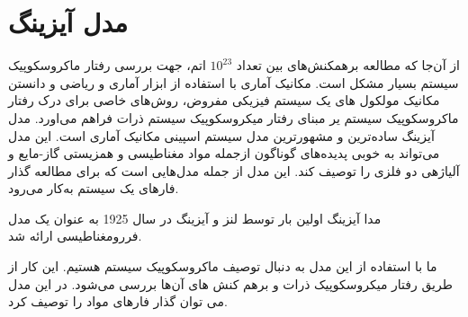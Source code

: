 \documentclass[a4paper,12pt]{article}
\begin{document}
\section{مدل آیزینگ}
از آن‌جا که مطالعه برهمکنش‌های بین تعداد
$10^{23}$
اتم، جهت بررسی رفتار ماکروسکوپیک سیستم بسیار مشکل است.
مکانیک آماری با استفاده از ابزار آماری و ریاضی و دانستن
مکانیک مولکول های یک سیستم فیزیكی مفروض، روش‌های خاصی برای درک رفتار
ماکروسکوپیک سیستم یر مبنای رفتار میکروسکوپیک سیستم ذرات
فراهم می‌اورد.
مدل آیزینگ ساده‌ترین و مشهور‌ترین مدل سیستم اسپینی 
مکانیک آماری است. این مدل می‌تواند به خوبی
پدیده‌های گوناگون ازجمله مواد مغناطیسی و همزیستی گاز-مایع
و آلیاژهی دو فلزی را توصیف کند.
این مدل از جمله مدل‌هایی است که برای مطالعه گذار فارهای یک سیستم به‌کار می‌رود.

مدا آیزینگ اولین بار توسط لنز و آیزینگ در سال 1925 به عنوان
یک مدل فررومغناطیسی ارائه شد.


ما با استفاده از این مدل به دنبال توصیف ماکروسکوپیک سیستم هستیم.
این کار از طریق رفتار میکروسکوپیک ذرات و بر‌هم کنش های آن‌ها بررسی می‌شود.
در این مدل می توان گذار فارهای مواد را توصیف کرد.
\end{document}
